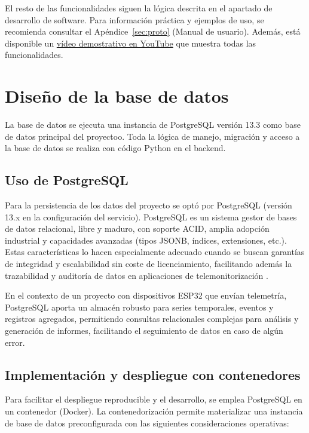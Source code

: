 \documentclass[12pt, a4paper]{article}
\begin{document}
	El resto de las funcionalidades siguen la lógica descrita en el apartado de desarrollo de software. 
	Para información práctica y ejemplos de uso, se recomienda consultar el Apéndice~\ref{sec:proto} (Manual de usuario). 
	Además, está disponible un \href{https://www.youtube.com/watch?v=y1xrh9f9NOg}{vídeo demostrativo en YouTube} que muestra todas las funcionalidades.

\section{Diseño de la base de datos}


La base de datos se ejecuta una instancia de PostgreSQL versión 13.3 como base de datos principal del proyectoo. Toda la lógica de manejo, migración y acceso a la base de datos se realiza con código Python en el backend.



\subsection{Uso de PostgreSQL}

Para la persistencia de los datos del proyecto se optó por PostgreSQL (versión 13.x en la configuración del servicio). PostgreSQL es un sistema gestor de bases de datos relacional, libre y maduro, con soporte ACID, amplia adopción industrial y capacidades avanzadas (tipos JSONB, índices, extensiones, etc.). Estas características lo hacen especialmente adecuado cuando se buscan garantías de integridad y escalabilidad sin coste de licenciamiento, facilitando además la trazabilidad y auditoría de datos en aplicaciones de telemonitorización \cite{postgresql_doc,postgresql_13}.

En el contexto de un proyecto con dispositivos ESP32 que envían telemetría, PostgreSQL aporta un almacén robusto para series temporales, eventos y registros agregados, permitiendo consultas relacionales complejas para análisis y generación de informes, facilitando el seguimiento de datos en caso de algún error.

\subsection{Implementación y despliegue con contenedores}

Para facilitar el despliegue reproducible y el desarrollo, se emplea PostgreSQL en un contenedor (Docker). La contenedorización permite materializar una instancia de base de datos preconfigurada con las siguientes consideraciones operativas:
\end{document}

